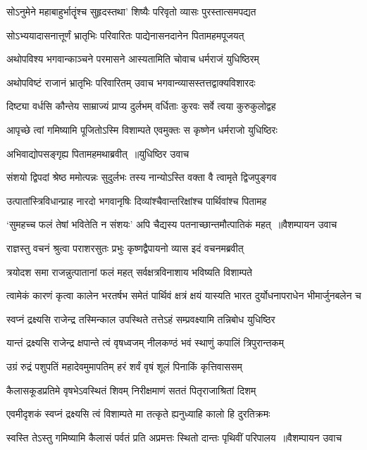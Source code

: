 \twolineshloka
{सोऽनुमेने महाबाहुर्भातॄंश्च सुहृदस्तथा'}
{शिष्यैः परिवृतो व्यासः पुरस्तात्समपद्यत}


\twolineshloka
{सोऽभ्ययादासनात्तूर्णं भ्रातृभिः परिवारितः}
{पाद्येनासनदानेन पितामहमपूजयत्}


\twolineshloka
{अथोपविश्य भगवान्काञ्चने परमासने}
{आस्यतामिति चोवाच धर्मराजं युधिष्ठिरम्}


\twolineshloka
{अथोपविष्टं राजानं भ्रातृभिः परिवारितम्}
{उवाच भगवान्व्यासस्तत्तद्वाक्यविशारदः}


\twolineshloka
{दिष्ट्या वर्धसि कौन्तेय साम्राज्यं प्राप्य दुर्लभम्}
{वर्धिताः कुरवः सर्वे त्वया कुरुकुलोद्वह}


\twolineshloka
{आपृच्छे त्वां गमिष्यामि पूजितोऽस्मि विशाम्पते}
{एवमुक्तः स कृष्णेन धर्मराजो युधिष्ठिरः}


\twolineshloka
{अभिवाद्योपसङ्गृह्य पितामहमथाब्रवीत् ॥युधिष्ठिर उवाच}
{}


\twolineshloka
{संशयो द्विपदां श्रेष्ठ ममोत्पन्नः सुदुर्लभः}
{तस्य नान्योऽस्ति वक्ता वै त्वामृते द्विजपुङ्गव}


\twolineshloka
{उत्पातांस्त्रिविधान्प्राह नारदो भगवानृषिः}
{दिव्यांश्चैवान्तरिक्षांश्च पार्थिवांश्च पितामह}


\twolineshloka
{`सुमहच्च फलं तेषां भवितेति न संशयः'}
{अपि चैद्यस्य पतनाच्छान्तमौत्पातिकं महत् ॥वैशम्पायन उवाच}


\twolineshloka
{राज्ञस्तु वचनं श्रुत्वा पराशरसुतः प्रभुः}
{कृष्णद्वैपायनो व्यास इदं वचनमब्रवीत्}


\twolineshloka
{त्रयोदश समा राजन्नुत्पातानां फलं महत्}
{सर्वक्षत्रविनाशाय भविष्यति विशाम्पते}


\threelineshloka
{त्वामेकं कारणं कृत्वा कालेन भरतर्षभ}
{समेतं पार्थिवं क्षत्रं क्षयं यास्यति भारत}
{दुर्योधनापराधेन भीमार्जुनबलेन च}


\twolineshloka
{स्वप्नं द्रक्ष्यसि राजेन्द्र तस्मिन्काल उपस्थिते}
{तत्तेऽहं सम्प्रवक्ष्यामि तन्निबोध युधिष्ठिर}


\twolineshloka
{यान्तं द्रक्ष्यसि राजेन्द्र क्षपान्ते त्वं वृषध्वजम्}
{नीलकण्ठं भवं स्थाणुं कपालिं त्रिपुरान्तकम्}


\twolineshloka
{उग्रं रुद्रं पशुपतिं महादेवमुमापतिम्}
{हरं शर्वं वृषं शूलं पिनाकिं कृत्तिवाससम्}


\twolineshloka
{कैलासकूडप्रतिमे वृषभेऽवस्थितं शिवम्}
{निरीक्षमाणं सततं पितृराजाश्रितां दिशम्}


\twolineshloka
{एवमीदृशकं स्वप्नं द्रक्ष्यसि त्वं विशाम्पते}
{मा तत्कृते ह्यनुध्याहि कालो हि दुरतिक्रमः}


\twolineshloka
{स्वस्ति तेऽस्तु गमिष्यामि कैलासं पर्वतं प्रति}
{अप्रमत्तः स्थितो दान्तः पृथिवीं परिपालय ॥वैशम्पायन उवाच}


